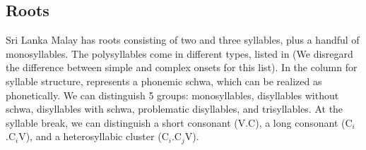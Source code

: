 \subsection{Roots}\label{sec:phon:struct:Roots}
Sri Lanka Malay has roots consisting of two and three syllables, plus a handful of monosyllables. The polysyllables come in  different types, listed in  (We disregard the difference between simple and complex onsets for this list). In the column for syllable structure, \E{} represents a phonemic schwa, which can be realized as  phonetically. We can distinguish 5 groups: monosyllables, disyllables without schwa, disyllables with schwa, problematic disyllables, and trisyllables. At the syllable break, we can distinguish a short consonant (V.C), a long consonant (C$_i$.C$_i$V), and a heterosyllabic cluster (C$_i$.C$_j$V).


\setcounter{mycounter}{1}

